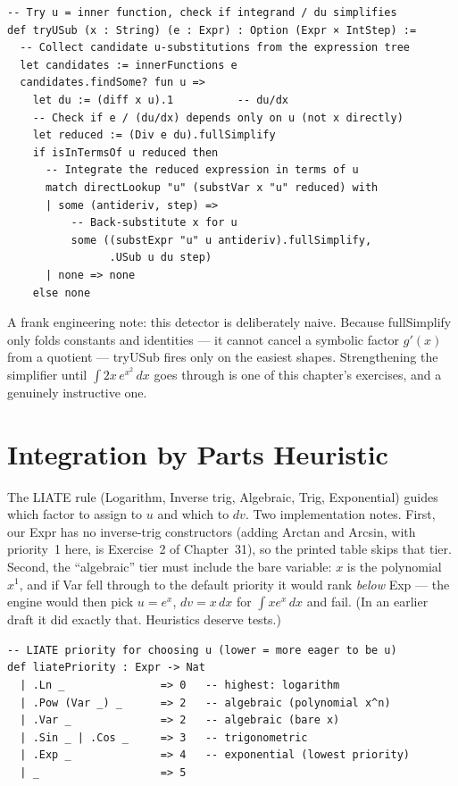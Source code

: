 \documentclass[12pt, openany]{book}
\theoremstyle{plain}
\theoremstyle{definition}
\theoremstyle{remark}
\newcommand{\li}[1]{{\ttfamily\small\color{tealaccent}#1}}
\begin{document}
\begin{leanbox}
\begin{lstlisting}
-- Try u = inner function, check if integrand / du simplifies
def tryUSub (x : String) (e : Expr) : Option (Expr × IntStep) :=
  -- Collect candidate u-substitutions from the expression tree
  let candidates := innerFunctions e
  candidates.findSome? fun u =>
    let du := (diff x u).1          -- du/dx
    -- Check if e / (du/dx) depends only on u (not x directly)
    let reduced := (Div e du).fullSimplify
    if isInTermsOf u reduced then
      -- Integrate the reduced expression in terms of u
      match directLookup "u" (substVar x "u" reduced) with
      | some (antideriv, step) =>
          -- Back-substitute x for u
          some ((substExpr "u" u antideriv).fullSimplify,
                .USub u du step)
      | none => none
    else none
\end{lstlisting}
\end{leanbox}
\color{black}

A frank engineering note: this detector is deliberately naive.  Because \li{fullSimplify} only folds constants and identities --- it cannot cancel a symbolic factor $g'(x)$ from a quotient --- \li{tryUSub} fires only on the easiest shapes.  Strengthening the simplifier until $\int 2x\,e^{x^2}\,dx$ goes through is one of this chapter's exercises, and a genuinely instructive one.

\section{Integration by Parts Heuristic}

The LIATE rule (Logarithm, Inverse trig, Algebraic, Trig, Exponential) guides
which factor to assign to $u$ and which to $dv$.  Two implementation notes.
First, our \li{Expr} has no inverse-trig constructors (adding \li{Arctan} and
\li{Arcsin}, with priority~1 here, is Exercise~2 of Chapter~31), so the printed
table skips that tier.  Second, the ``algebraic'' tier must include the bare
variable: $x$ is the polynomial $x^1$, and if \li{Var} fell through to the
default priority it would rank \emph{below} \li{Exp} --- the engine would then
pick $u = e^x$, $dv = x\,dx$ for $\int x e^x\,dx$ and fail.  (In an earlier
draft it did exactly that.  Heuristics deserve tests.)

\begin{leanbox}
\begin{lstlisting}
-- LIATE priority for choosing u (lower = more eager to be u)
def liatePriority : Expr -> Nat
  | .Ln _               => 0   -- highest: logarithm
  | .Pow (Var _) _      => 2   -- algebraic (polynomial x^n)
  | .Var _              => 2   -- algebraic (bare x)
  | .Sin _ | .Cos _     => 3   -- trigonometric
  | .Exp _              => 4   -- exponential (lowest priority)
  | _                   => 5
\end{lstlisting}
\end{leanbox}
\color{black}
\end{document}
